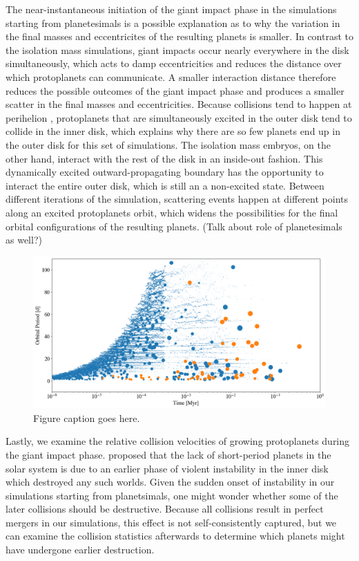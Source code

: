 The near-instantaneous initiation of the giant impact phase in the simulations starting from planetesimals is a possible explanation as to why the variation in the final masses and eccentricites of the resulting planets is smaller. In contrast to the isolation mass simulations, giant impacts occur nearly everywhere in the disk simultaneously, which acts to damp eccentricities and reduces the distance over which protoplanets can communicate. A smaller interaction distance therefore reduces the possible outcomes of the giant impact phase and produces a smaller scatter in the final masses and eccentricities. Because collisions tend to happen at perihelion \cite{levison03}, protoplanets that are simultaneously excited in the outer disk tend to collide in the inner disk, which explains why there are so few planets end up in the outer disk for this set of simulations. The isolation mass embryos, on the other hand, interact with the rest of the disk in an inside-out fashion. This dynamically excited outward-propagating boundary has the opportunity to interact the entire outer disk, which is still an a non-excited state. Between different iterations of the simulation, scattering events happen at different points along an excited protoplanets orbit, which widens the possibilities for the final orbital configurations of the resulting planets. (Talk about role of planetesimals as well?)


\begin{figure}
\begin{center}
    \includegraphics[width=\textwidth]{figures/stip/full_coll_iso_comp.png}
    \caption{Figure caption goes here.\label{fig:full_coll_iso_comp}}
\end{center}
\end{figure}

Lastly, we examine the relative collision velocities of growing protoplanets during the giant impact phase. \cite{volk15} proposed that the lack of short-period planets in the solar system is due to an earlier phase of violent instability in the inner disk which destroyed any such worlds. Given the sudden onset of instability in our simulations starting from planetsimals, one might wonder whether some of the later collisions should be destructive. Because all collisions result in perfect mergers in our simulations, this effect is not self-consistently captured, but we can examine the collision statistics afterwards to determine which planets might have undergone earlier destruction.

